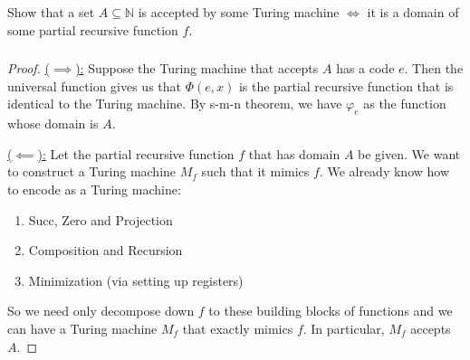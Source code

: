 \documentclass{article}
\title{\mytitle}
\author{\myname}
\date{\today}
\theoremstyle{plain}
\newcommand{\N}{\mathbb{N}}
\begin{document}
\maketitle
\section{}
\section{}
Show that a set $A\subseteq\N$ is accepted by some Turing machine $\iff$ it is a domain of
some partial recursive function $f$.
\subsubsection{}
\begin{proof}
\underline{($\implies$):} Suppose the Turing machine that accepts $A$ has a code
$e$. Then the universal function gives us that $\Phi(e, x)$ is the partial
recursive function that is identical to the Turing machine. By s-m-n theorem, we
have $\varphi_{e}$ as the function whose domain is $A$.

\medskip
\underline{($\impliedby$):} Let the partial recursive function $f$ that has
domain $A$ be given. We want to construct a Turing machine $M_{f}$ such that it
mimics $f$. We already know how to encode as a Turing machine:
\begin{enumerate}
\item Succ, Zero and Projection
\item Composition and Recursion
\item Minimization (via setting up registers)
\end{enumerate}
So we need only decompose down $f$ to these building blocks of functions and we
can have a Turing machine $M_{f}$ that exactly mimics $f$. In particular,
$M_{f}$ accepts $A$.
\end{proof}
\end{document}
